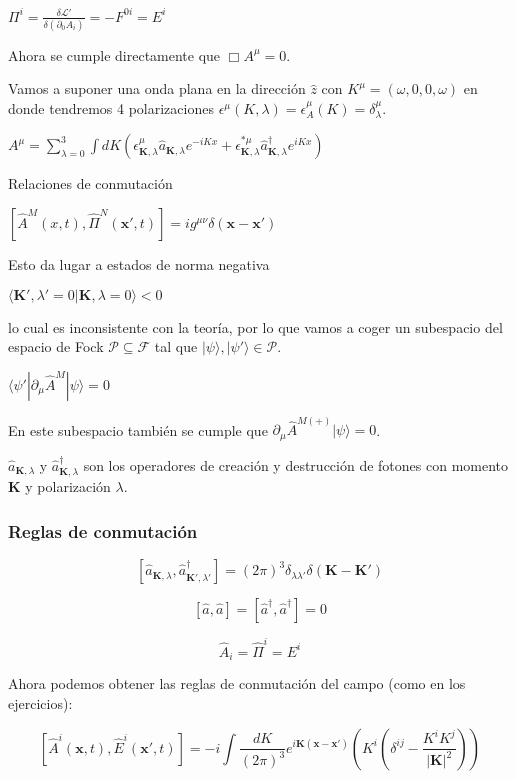 $
\Pi^i = \frac{\delta \mathcal{L}'}{\delta(\partial_0 A_i)} = -F^{0i} = E^i
$

Ahora se cumple directamente que $\Box A^\mu = 0$.

Vamos a suponer una onda plana en la dirección $\hat{z}$ con $K^\mu = (\omega, 0, 0, \omega)$ en donde tendremos 4 polarizaciones $\epsilon^\mu(K, \lambda) = \epsilon^\mu_A(K) = \delta^\mu_\lambda$.

$
A^\mu = \sum_{\lambda = 0}^3 \int dK \left( \epsilon^\mu_{\mathbf{K}, \lambda} \hat{a}_{\mathbf{K}, \lambda} e^{-iKx} + \epsilon^{\ast \mu}_{\mathbf{K}, \lambda} \hat{a}_{\mathbf{K}, \lambda}^\dagger e^{iKx} \right)
$

Relaciones de conmutación

$
[\hat{A}^M(x, t), \hat{\Pi}^N(\mathbf{x}', t)] = i g^{\mu\nu} \delta(\mathbf{x} - \mathbf{x'})
$

Esto da lugar a estados de norma negativa

$
\langle \mathbf{K}', \lambda' = 0 | \mathbf{K}, \lambda = 0 \rangle < 0 
$

lo cual es inconsistente con la teoría, por lo que vamos a coger un subespacio del espacio de Fock $\mathcal{P} \subseteq \mathcal{F}$ tal que $|\psi\rangle, |\psi'\rangle \in \mathcal{P}$.

$ 
\langle \psi' | \partial_\mu \hat{A}^M |\psi\rangle = 0 
$

En este subespacio también se cumple que $ \partial_\mu \hat{A}^{M (+)} |\psi\rangle = 0 $.

$\hat{a}_{\mathbf{K},\lambda}$ y $\hat{a}^\dagger_{\mathbf{K},\lambda}$ son los operadores de creación y destrucción de fotones con momento $\mathbf{K}$ y polarización $\lambda$.

\subsubsection{Reglas de conmutación}

$$
[\hat{a}_{\mathbf{K},\lambda}, \hat{a}^\dagger_{\mathbf{K}',\lambda'}] = (2\pi)^3 \delta_{\lambda\lambda'} \delta(\mathbf{K} - \mathbf{K'})
$$

$$
[\hat{a}, \hat{a}] = [\hat{a}^\dagger, \hat{a}^\dagger] = 0
$$

$$
\hat{A}_i = \hat{\Pi}^i = E^i
$$

Ahora podemos obtener las reglas de conmutación del campo (como en los ejercicios):

$$
[\hat{A}^i(\mathbf{x}, t), \hat{E}^i(\mathbf{x}', t)] = -i \int \frac{dK}{(2\pi)^3} e^{i \mathbf{K} (\mathbf{x} - \mathbf{x'})} \left(K^i \left(\delta^{ij} - \frac{K^i K^j}{|\mathbf{K}|^2}\right)\right)
$$

